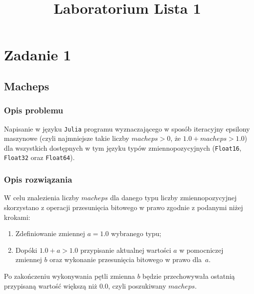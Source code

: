 \documentclass{classrep}
\author{
  \studentinfo{Agata Jasionowska}{229726}
}
\title{Laboratorium \ppauza Lista 1}
\begin{document}
\maketitle

\section{Zadanie 1}
	\subsection{Macheps}
		\subsubsection{Opis problemu}
			Napisanie w języku \texttt{Julia} programu wyznaczającego w sposób iteracyjny epsilony 
			maszynowe (czyli najmniejsze takie liczby $macheps > 0$, że $1.0 + macheps > 1.0$) 
			dla wszystkich dostępnych w tym języku typów zmiennopozycyjnych (\texttt{Float16},
			\texttt{Float32} oraz \texttt{Float64}).
		\subsubsection{Opis rozwiązania}
			W celu znalezienia liczby $macheps$ dla danego typu liczby zmiennopozycyjnej
			skorzystano	z operacji przesunięcia bitowego w prawo zgodnie z podanymi niżej krokami:
			\begin{enumerate}
				\item Zdefiniowanie zmiennej $a = 1.0$ wybranego typu;
				\item Dopóki $1.0 + a > 1.0$ przypisanie aktualnej wartości $a$ w pomocniczej 
				zmiennej $b$ oraz wykonanie przesunięcia bitowego w prawo dla~$a$.
			\end{enumerate}
			Po zakończeniu wykonywania pętli zmienna	$b$ będzie przechowywała ostatnią przypisaną wartość większą niż $0.0$, czyli 
			poszukiwany $macheps$.
\end{document}
